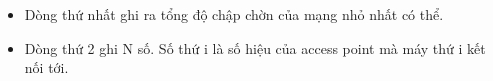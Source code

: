 \begin{itemize}
	\item Dòng thứ nhất ghi ra tổng độ chập chờn của mạng nhỏ nhất có thể.
	\item Dòng thứ 2 ghi N số. Số thứ i là số hiệu của access point mà máy thứ i kết nối tới.
\end{itemize}